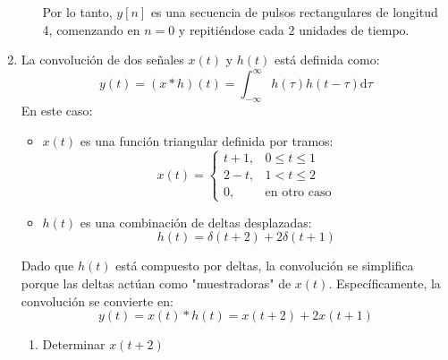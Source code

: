 \begin{enumerate}[label=\color{red}\textbf{\arabic*)}]
\begin{enumerate}[label=\color{red}\textbf{\alph*)}]
        Por lo tanto,  $y[n]$ es una secuencia de pulsos rectangulares de longitud 4, comenzando en  $n=0$ y repitiéndose cada 2 unidades de tiempo.
         \begin{center}
        \end{center}
    \end{enumerate}
  \item {}
La convolución de dos señales $x(t)$ y  $h(t)$ está definida como:  \[
y(t)=(x\ast h)(t)=\int_{-\infty}^{\infty} h(\tau)h(t-\tau)\mathrm{d}\tau 
\] 
En este caso:
\begin{itemize}[label=\textbullet]
  \item $x(t)$ es una función triangular definida por tramos:  \[
  x(t)=\begin{cases}
    t+1, & 0\le t\le 1\\
    2-t, & 1<t\le 2\\
    0, & \text{en otro caso}
  \end{cases}
  \] 
\item $h(t)$ es una combinación de deltas desplazadas:  \[
h(t)=\delta(t+2)+2\delta(t+1)
\] 
\end{itemize}
Dado que $h(t)$ está compuesto por deltas, la convolución se simplifica porque las deltas actúan como "muestradoras" de  $x(t)$. Específicamente, la convolución se convierte en:  \[
y(t)=x(t)\ast h(t)=x(t+2)+2x(t+1)
\] 
\begin{enumerate}[label=Paso \arabic*:]
  \item Determinar $x(t+2)$


\end{enumerate}
\end{enumerate}
